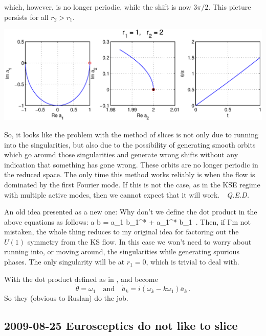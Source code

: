 which, however, is no longer periodic, while the shift is now $3\pi/2$.  This picture persists for all $r_2 > r_1$.

\vspace{2ex}\noindent\includegraphics[width=\textwidth]{sliceflow7}

So, it looks like the problem with the method of slices is not only due to running into the singularities,
but also due to the possibility of generating smooth orbits which go around those singularities
and generate wrong shifts without any indication that something has gone wrong.
These orbits are no longer periodic in the reduced space.  The only time this method works
reliably is when the flow is dominated by the first Fourier mode.  If this is not the case,
as in the KSE regime with multiple active modes, then we cannot expect that it will work.~~{\em Q.E.D.}

\vspace{2ex}
An old idea presented as a new one:  Why don't we define the dot product in the above equations as follows:
\beq
 a \cdot b = a_1 b_1^* + a_1^* b_1
 \,.
Then, if I'm not mistaken, the whole thing reduces to my original idea for factoring out the $U(1)$
symmetry from the KS flow.  In this case we won't need to worry about running into, or moving around,
the singularities while generating spurious phases.  The only singularity will be at $r_1 = 0$,
which is trivial to deal with.

With the dot product defined as in ,
 and  become
\[
  \dot{\theta} = \omega_1
  \quad \mathrm{and} \quad
  \dot{\bar{a}}_k = i(\omega_k - k\omega_1) \bar{a}_k
\,.
\]
So they (obvious to Ruslan) do the job.


\subsection{2009-08-25 Eurosceptics do not like to slice}
\label{2009-08-25Eurosceptics}

